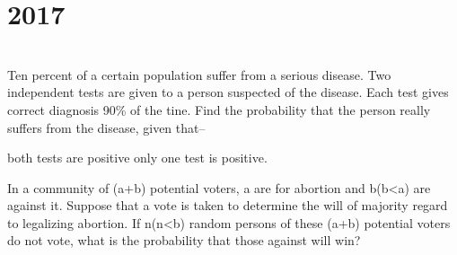 \section*{2017}
\vspace{-.5cm}
\hrulefill \smallskip\\
 Ten percent of a certain population suffer from a serious disease. Two independent tests are given to a person suspected of the disease. Each test gives correct diagnosis 90\% of the tine. Find the probability that the person really suffers from the disease, given that--
\begin{tasks} \task both tests are positive \task only one test is positive. \end{tasks}
 In a community of (a+b) potential voters, a are for abortion and b(b<a) are against it. Suppose that a vote is taken to determine the will of majority regard to legalizing abortion. If n(n<b) random persons of these (a+b) potential voters do not vote, what is the probability that those against will win?